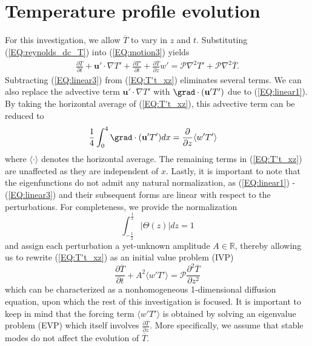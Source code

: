 \documentclass[twocolumn,showpacs,amsmath,amssymb]{revtex4}
\def\bar{\overline}
\begin{document}
\section{Temperature profile evolution}\label{sec:evolution}
For this investigation, we allow $ \bar{T}$ to vary in $z$ and $t$. Substituting (\ref{EQ:reynolds_dc_T}) into (\ref{EQ:motion3}) yields
\begin{align}
    \frac{\partial \bar{T}}{\partial t} + \mathbf{u}' \cdot \nabla T' + \frac{\partial T'}{\partial t} + \frac{\partial \bar{T}}{\partial z} w' = \mathcal{P} \nabla^2 T' + \mathcal{P} \nabla^2 \bar{T}.
    \label{EQ:T't_xz}
\end{align}
Subtracting (\ref{EQ:linear3}) from (\ref{EQ:T't_xz}) eliminates several terms. We can also replace the advective term $\mathbf{u}' \cdot \nabla T'$ with $\grad \cdot (\mathbf{u}'T')$ due to (\ref{EQ:linear1}). By taking the horizontal average of (\ref{EQ:T't_xz}), this advective term can be reduced to
\begin{align}
    \frac{1}{4}\int_0^4 \grad \cdot (\mathbf{u}'T') dx &= \frac{\partial }{\partial z}  \langle w'T' \rangle
\end{align}
where $\langle \cdot \rangle$ denotes the horizontal average. The remaining terms in (\ref{EQ:T't_xz}) are unaffected as they are independent of $x$. Lastly, it is important to note that the eigenfunctions do not admit any natural normalization, as (\ref{EQ:linear1}) - (\ref{EQ:linear3}) and their subsequent forms are linear with respect to the perturbations. For completeness, we provide the normalization 
\begin{equation}
    \int_{-\frac{1}{2}}^{\frac{1}{2}} \big| \Theta (z) \big| dz = 1
\end{equation}
and assign each perturbation a yet-unknown amplitude $A \in \mathbb{R}$, thereby allowing us to rewrite (\ref{EQ:T't_xz}) as an initial value problem (IVP)
\begin{equation}
    \frac{\partial \bar{T}}{\partial t} + A^2 \langle w'T' \rangle = \mathcal{P}  \frac{\partial^2 \bar{T}}{\partial z^2} \label{EQ:T0_IVP}
\end{equation}
which can be characterized as a nonhomogeneous  1-dimensional diffusion equation, upon which the rest of this investigation is focused. It is important to keep in mind that the forcing term $\langle w'T' \rangle$ is obtained by solving an eigenvalue problem (EVP) which itself involves $\frac{\partial \bar{T}}{\partial z}$. More specifically, we assume that stable modes do not affect the evolution of $\bar{T}$.
\end{document}
